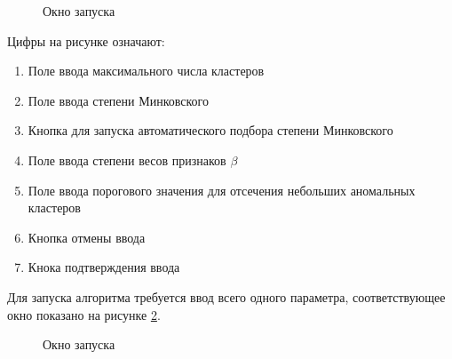 \documentclass[12pt,tikz]{instruction}
\begin{document}
\begin{figure}[H]
	\centering
	\caption{Окно запуска \AWardpb}
	\label{fig:param-dialog-a-ward-pb}
\end{figure}

Цифры на рисунке означают:
\begin{enumerate}
	\item Поле ввода максимального числа кластеров
	\item Поле ввода степени Минковского
	\item Кнопка для запуска автоматического подбора степени Минковского
	\item Поле ввода степени весов признаков $ \beta $
	\item Поле ввода порогового значения для отсечения небольших аномальных кластеров
	\item Кнопка отмены ввода
	\item Кнока подтверждения ввода
\end{enumerate}

\textbf{\BiKMR}

Для запуска алгоритма \BiKMR требуется ввод всего одного параметра, соответствующее окно показано на рисунке \ref{fig:param-dialog-bikmr}.

\begin{figure}[H]
	\centering
	\caption{Окно запуска \BiKMR}
	\label{fig:param-dialog-bikmr}
\end{figure}
\end{document}
